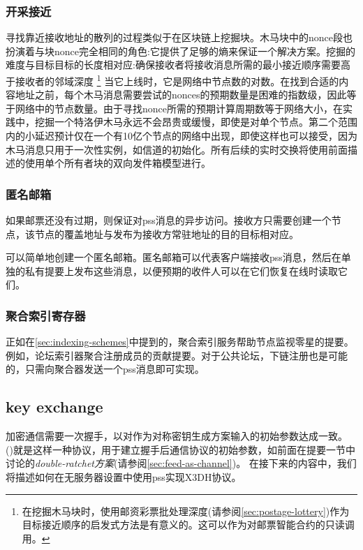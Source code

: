 \subsubsection{开采接近}

寻找靠近接收地址的散列的过程类似于在区块链上挖掘块。木马块中的nonce段也扮演着与块nonce完全相同的角色:它提供了足够的熵来保证一个解决方案。挖掘的难度与目标目标的长度相对应:确保接收者将接收消息所需的最小接近顺序需要高于接收者的邻域深度%
%
\footnote{在挖掘木马块时，使用邮资彩票批处理深度(请参阅\ref{sec:postage-lottery})作为目标接近顺序的启发式方法是有意义的。这可以作为对邮票智能合约的只读调用。}
%
当它上线时，它是网络中节点数的对数。在找到合适的内容地址之前，每个木马消息需要尝试的nonces的预期数量是困难的指数级，因此等于网络中的节点数量。由于寻找nonce所需的预期计算周期数等于网络大小，在实践中，挖掘一个特洛伊木马永远不会昂贵或缓慢，即使是对单个节点。第二个范围内的小延迟预计仅在一个有10亿个节点的网络中出现，即使这样也可以接受，因为木马消息只用于一次性实例，如信道的初始化。所有后续的实时交换将使用前面描述的使用单个所有者块的双向发件箱模型进行。


\subsubsection{匿名邮箱}

如果邮票还没有过期，则保证对pss消息的异步访问。接收方只需要创建一个节点，该节点的覆盖地址与发布为接收方常驻地址的目的目标相对应。    

可以简单地创建一个匿名邮箱。匿名邮箱可以代表客户端接收pss消息，然后在单独的私有提要上发布这些消息，以便预期的收件人可以在它们恢复在线时读取它们。

\subsubsection{聚合索引寄存器}

正如在\ref{sec:indexing-schemes}中提到的，聚合索引服务帮助节点监视零星的提要。例如，论坛索引器聚合注册成员的贡献提要。对于公共论坛，下链注册也是可能的，只需向聚合器发送一个pss消息即可实现。 


\subsection{key exchange}\label{sec:pss-key-exchange}


加密通信需要一次握手，以对作为对称密钥生成方案输入的初始参数达成一致。 ()就是这样一种协议\cite{marlinspike2016x3dh}，用于建立握手后通信协议的初始参数，如前面在提要一节中讨论的\emph{double-ratchet方案}(请参阅\ref{sec:feed-as-channel})。 
在接下来的内容中，我们将描述如何在无服务器设置中使用pss实现X3DH协议。 

